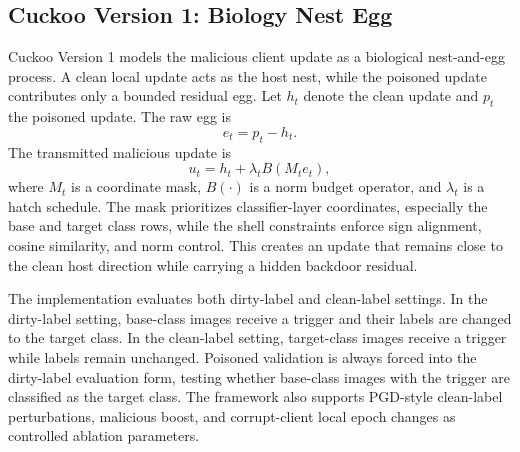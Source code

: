 \subsection{Cuckoo Version 1: Biology Nest Egg}
Cuckoo Version 1 models the malicious client update as a biological nest-and-egg process. A clean local update acts as the host nest, while the poisoned update contributes only a bounded residual egg. Let $h_t$ denote the clean update and $p_t$ the poisoned update. The raw egg is
\begin{equation}
    e_t = p_t - h_t.
\end{equation}
The transmitted malicious update is
\begin{equation}
    u_t = h_t + \lambda_t B(M_t e_t),
\end{equation}
where $M_t$ is a coordinate mask, $B(\cdot)$ is a norm budget operator, and $\lambda_t$ is a hatch schedule. The mask prioritizes classifier-layer coordinates, especially the base and target class rows, while the shell constraints enforce sign alignment, cosine similarity, and norm control. This creates an update that remains close to the clean host direction while carrying a hidden backdoor residual.

The implementation evaluates both dirty-label and clean-label settings. In the dirty-label setting, base-class images receive a trigger and their labels are changed to the target class. In the clean-label setting, target-class images receive a trigger while labels remain unchanged. Poisoned validation is always forced into the dirty-label evaluation form, testing whether base-class images with the trigger are classified as the target class. The framework also supports PGD-style clean-label perturbations, malicious boost, and corrupt-client local epoch changes as controlled ablation parameters.
